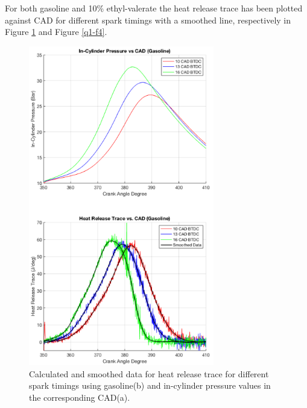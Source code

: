 \documentclass[11pt]{article}
\begin{document}
For both gasoline and 10\% ethyl-valerate the heat release trace has been plotted against CAD  for different spark timings with a smoothed line, respectively in Figure \ref{q1-f3} and Figure \ref{q1-f4}. 
\begin{figure}[H]
    \centering
    \includegraphics[height = 14cm]{./img/diagram10.png}
    \caption{Calculated and smoothed data for heat release trace for different spark timings using gasoline(b) and in-cylinder pressure values in the corresponding CAD(a).}
    \label{q1-f3}
\end{figure}
\end{document}

